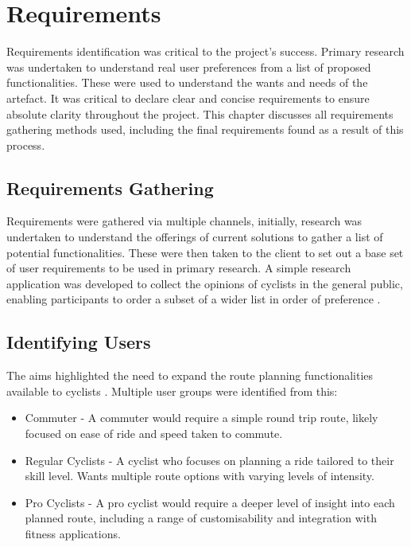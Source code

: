 \chapter{Requirements}
\label{chap:requirements}

Requirements identification was critical to the project's success. Primary research was undertaken to understand real user preferences from a list of proposed functionalities. These were used to understand the wants and needs of the artefact. It was critical to declare clear and concise requirements to ensure absolute clarity throughout the project. This chapter discusses all requirements gathering methods used, including the final requirements found as a result of this process.

\section{Requirements Gathering}
\label{requirements:gathering}

Requirements were gathered via multiple channels, initially, research was undertaken to understand the offerings of current solutions to gather a list of potential functionalities. These were then taken to the client to set out a base set of user requirements to be used in primary research. A simple research application was developed to collect the opinions of cyclists in the general public, enabling participants to order a subset of a wider list in order of preference .

\section{Identifying Users}
\label{requirements:identifyingusers} 
The aims highlighted the need to expand the route planning functionalities available to cyclists . Multiple user groups were identified from this:
\begin{itemize}
  \item Commuter - A commuter would require a simple round trip route, likely focused on ease of ride and speed taken to commute.
  \item Regular Cyclists - A cyclist who focuses on planning a ride tailored to their skill level. Wants multiple route options with varying levels of intensity.
  \item Pro Cyclists - A pro cyclist would require a deeper level of insight into each planned route, including a range of customisability and integration with fitness applications.
\end{itemize}


